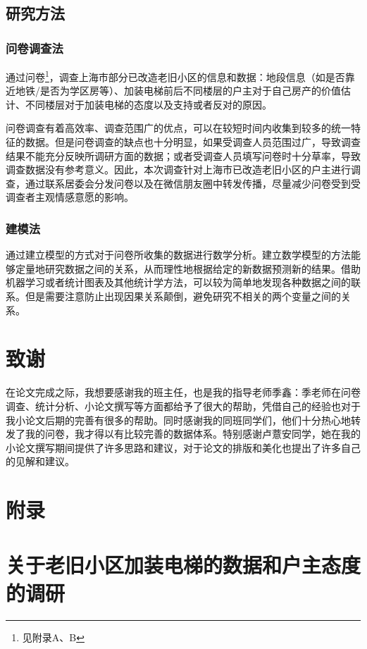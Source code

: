 \documentclass[lang=cn,a4paper]{elegantpaper}
\begin{document}
    \subsection{研究方法}

    \subsubsection{问卷调查法}
    通过问卷\footnote{见附录A、B}，调查上海市部分已改造老旧小区的信息和数据：地段信息（如是否靠近地铁/是否为学区房等）、加装电梯前后不同楼层的户主对于自己房产的价值估计、不同楼层对于加装电梯的态度以及支持或者反对的原因。

    问卷调查有着高效率、调查范围广的优点，可以在较短时间内收集到较多的统一特征的数据。但是问卷调查的缺点也十分明显，如果受调查人员范围过广，导致调查结果不能充分反映所调研方面的数据；或者受调查人员填写问卷时十分草率，导致调查数据没有参考意义。因此，本次调查针对上海市已改造老旧小区的户主进行调查，通过联系居委会分发问卷以及在微信朋友圈中转发传播，尽量减少问卷受到受调查者主观情感意愿的影响。

    \subsubsection{建模法}
    通过建立模型的方式对于问卷所收集的数据进行数学分析。建立数学模型的方法能够定量地研究数据之间的关系，从而理性地根据给定的新数据预测新的结果。借助机器学习或者统计图表及其他统计学方法，可以较为简单地发现各种数据之间的联系。但是需要注意防止出现因果关系颠倒，避免研究不相关的两个变量之间的关系。

    \section*{致谢}
    在论文完成之际，我想要感谢我的班主任，也是我的指导老师季鑫：季老师在问卷调查、统计分析、小论文撰写等方面都给予了很大的帮助，凭借自己的经验也对于我小论文后期的完善有很多的帮助。同时感谢我的同班同学们，他们十分热心地转发了我的问卷，我才得以有比较完善的数据体系。特别感谢卢薏安同学，她在我的小论文撰写期间提供了许多思路和建议，对于论文的排版和美化也提出了许多自己的见解和建议。
    
    \clearpage

    
    
    \clearpage
    
    \section*{附录}
    \appendix

    \section{关于老旧小区加装电梯的数据和户主态度的调研}
\end{document}
